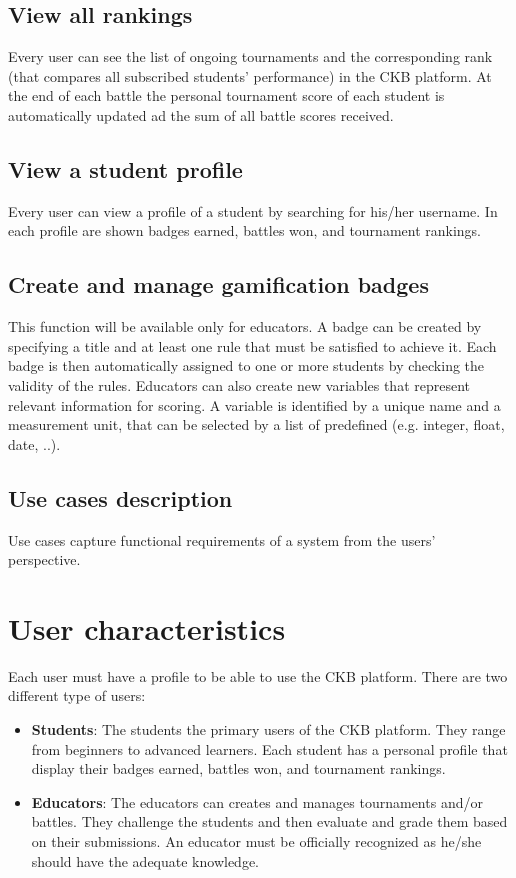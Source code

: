 \subsection{View all rankings}
Every user can see the list of ongoing tournaments and the corresponding rank (that compares all subscribed students' performance) in the CKB platform.
At the end of each battle the personal tournament score of each student is automatically updated ad the sum of all battle scores received. 

\subsection{View a student profile}
Every user can view a profile of a student by searching for his/her username. In each profile are shown badges earned, battles won, and tournament rankings. 

\subsection{Create and manage gamification badges}
This function will be available only for educators. \newline A badge can be created by specifying a title and at least one rule that must be satisfied to achieve it. Each badge is then automatically assigned to one or more students by checking the validity of the rules.
Educators can also create new variables that represent relevant information for scoring. A variable is identified by a unique name and a measurement unit, that can be selected by a list of predefined (e.g. integer, float, date, ..).

\subsection{Use cases description}
Use cases capture functional requirements of a system from the users' perspective.

\section{User characteristics}
Each user must have a profile to be able to use the CKB platform.
There are two different type of users:
\begin{itemize}
	\item \textbf{Students}:
	    The students the primary users of the CKB platform. They range from beginners to advanced learners. Each student has a personal profile that display their badges earned, battles won, and tournament rankings. 
	\item \textbf{Educators}: 
		The educators can creates and manages tournaments and/or battles. They challenge the students and then evaluate and grade them based on their submissions. An educator must be officially recognized as he/she should have the adequate knowledge.
\end{itemize}


